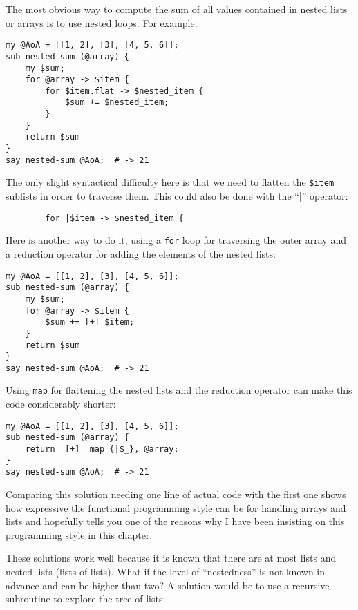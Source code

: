 The most obvious way to compute the sum of all values contained 
in nested lists or arrays is to use nested loops. For example:

\begin{verbatim}
my @AoA = [[1, 2], [3], [4, 5, 6]];
sub nested-sum (@array) { 
    my $sum; 
    for @array -> $item { 
        for $item.flat -> $nested_item {
            $sum += $nested_item;
        }
    } 
    return $sum
}
say nested-sum @AoA;  # -> 21
\end{verbatim}

The only slight syntactical difficulty here is that 
we need to flatten the \verb'$item' sublists in order 
to traverse them. This could also be done with the ``|'' 
operator:
\begin{verbatim}
        for |$item -> $nested_item {
\end{verbatim}

Here is another way to do it, using a {\tt for} loop for 
traversing the outer array and a reduction operator 
for adding the elements of the nested lists:

\begin{verbatim}
my @AoA = [[1, 2], [3], [4, 5, 6]];
sub nested-sum (@array) { 
    my $sum; 
    for @array -> $item { 
        $sum += [+] $item;
    } 
    return $sum
}
say nested-sum @AoA;  # -> 21
\end{verbatim}

Using {\tt map} for flattening the nested lists and 
the reduction operator can make this code considerably 
shorter:

\begin{verbatim}
my @AoA = [[1, 2], [3], [4, 5, 6]];
sub nested-sum (@array) { 
    return  [+]  map {|$_}, @array;
}
say nested-sum @AoA;  # -> 21
\end{verbatim}

Comparing this solution needing one line of actual code 
with the first one shows how expressive the functional 
programming style can be for handling arrays and lists 
and hopefully tells you one of the reasons why I have 
been insisting on this programming style in this 
chapter.

These solutions work well because it is known that there 
are at most lists and nested lists (lists of lists). What 
if the level of ``nestedness'' is not known in advance 
and can be higher than two? A solution would be to use 
a recursive subroutine to explore the tree of lists:

